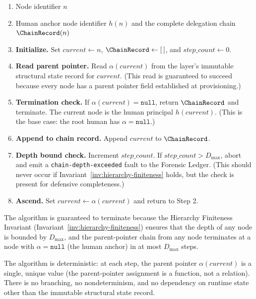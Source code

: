 \begin{algorithm}[htbp]
\caption{Chain Traversal Algorithm for escalation to human anchor $h(n)$}
\label{alg:chain-traversal}
\begin{enumerate}\itemsep=0pt
\item[\textbf{Input:}] Node identifier $n$
\item[\textbf{Output:}] Human anchor node identifier $h(n)$ and the complete delegation chain $\ChainRecord(n)$
\item[1.] \textbf{Initialize.} Set $current \leftarrow n$, $\ChainRecord \leftarrow [\,]$, and $step\_count \leftarrow 0$.
\item[2.] \textbf{Read parent pointer.} Read $\alpha(current)$ from the \fact{} layer's immutable structural state record for $current$. (This read is guaranteed to succeed because every node has a parent pointer field established at provisioning.)
\item[3.] \textbf{Termination check.} If $\alpha(current) = \texttt{null}$, return $\ChainRecord$ and terminate. The current node is the human principal $h(current)$. (This is the base case: the root human has $\alpha = \texttt{null}$.)
\item[4.] \textbf{Append to chain record.} Append $current$ to $\ChainRecord$.
\item[5.] \textbf{Depth bound check.} Increment $step\_count$. If $step\_count > D_{\max}$, abort and emit a \texttt{chain-depth-exceeded} fault to the Forensic Ledger. (This should never occur if Invariant~\ref{inv:hierarchy-finiteness} holds, but the check is present for defensive completeness.)
\item[6.] \textbf{Ascend.} Set $current \leftarrow \alpha(current)$ and return to Step 2.
\end{enumerate}
\end{algorithm}

The algorithm is guaranteed to terminate because the Hierarchy Finiteness Invariant (Invariant~\ref{inv:hierarchy-finiteness}) ensures that the depth of any node is bounded by $D_{\max}$, and the parent-pointer chain from any node terminates at a node with $\alpha = \texttt{null}$ (the human anchor) in at most $D_{\max}$ steps.

The algorithm is deterministic: at each step, the parent pointer $\alpha(current)$ is a single, unique value (the parent-pointer assignment is a function, not a relation). There is no branching, no nondeterminism, and no dependency on runtime state other than the immutable structural state record.

